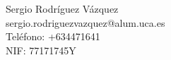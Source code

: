 Sergio Rodríguez Vázquez \\ %
sergio.rodriguezvazquez@alum.uca.es \\ %
Teléfono: +634471641 \\ %
NIF: 77171745Y \\ %
